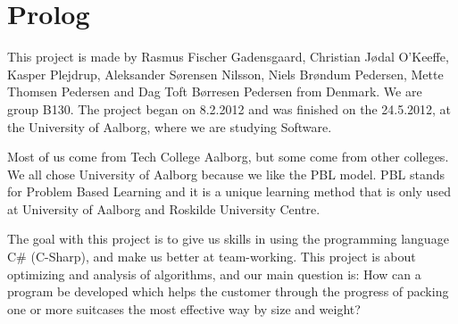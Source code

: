 \chapter{Prolog}

This project is made by Rasmus Fischer Gadensgaard, Christian Jødal O’Keeffe, Kasper Plejdrup, Aleksander Sørensen Nilsson, Niels Brøndum Pedersen, Mette Thomsen Pedersen and Dag Toft Børresen Pedersen from Denmark. We are group B130. The project began on 8.2.2012 and was finished on the 24.5.2012, at the University of Aalborg, where we are studying Software.

Most of us come from Tech College Aalborg, but some come from other colleges. We all chose University of Aalborg because we like the PBL model. PBL stands for Problem Based Learning and it is a unique learning method that is only used at University of Aalborg and Roskilde University Centre.

The goal with this project is to give us skills in using the programming language C\# (C-Sharp), and make us better at team-working. This project is about optimizing and analysis of algorithms, and our main question is: How can a program be developed which helps the customer through the progress of packing one or more suitcases the most effective way by size and weight?
